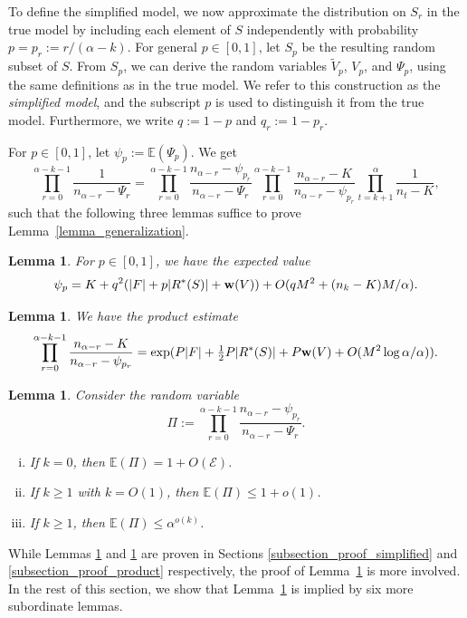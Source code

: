 \documentclass{article}
\theoremstyle{plain}
\theoremstyle{remark}
\theoremstyle{plain}
\newtheorem{lemma}[theorem]{Lemma}
\numberwithin{equation}{section}
\renewcommand{\b}{{\bf{w}}}
\begin{document}
	
	To define the simplified model, we now approximate the distribution on $S_r$ in the true model by including each element of $S$ independently with probability $p=p_r:=r/(\alpha-k)$. For general $p\in[0,1]$, let $S_p$ be the resulting random subset of $S$. From $S_p$, we can derive the random variables $\widetilde{V}_p$, $V_p$, and $\Psi_p$, using the same definitions as in the true model. We refer to this construction as the \emph{simplified model}, and the subscript $p$ is used to distinguish it from the true model. Furthermore, we write $q:=1-p$ and $q_r:=1-p_r$.
	
	For $p\in[0,1]$, let $\psi_p:=\mathbb{E}(\Psi_p)$. We get $$\prod_{r=0}^{\alpha-k-1}\frac1{n_{\alpha-r}-\Psi_r}=\prod_{r=0}^{\alpha-k-1}\frac{n_{\alpha-r}-\psi_{p_r}}{n_{\alpha-r}-\Psi_r}\prod_{r=0}^{\alpha-k-1}\frac{n_{\alpha-r}-K}{n_{\alpha-r}-\psi_{p_r}}\prod_{t=k+1}^{\alpha}\frac1{n_t-K},$$ such that the following three lemmas suffice to prove Lemma~\ref{lemma_generalization}.
	
	\begin{lemma}\label{lemma_expectation}
		For $p\in[0,1]$, we have the expected value $$\psi_p=K+q^2(|F|+p|R^*(S)|+\b(V))+O(qM^2+(n_k-K)M/\alpha).$$
	\end{lemma}
	
	\begin{lemma}\label{lemma_product}
		We have the product estimate $$\prod_{r=0}^{\alpha-k-1}\frac{n_{\alpha-r}-K}{n_{\alpha-r}-\psi_{p_r}}=\exp(P|F|+\tfrac12P|R^*(S)|+P\b(V)+O(M^2\log\alpha/\alpha)).$$
	\end{lemma}
	
	\begin{lemma}\label{lemma_concentration}
		Consider the random variable $$\Pi:=\prod_{r=0}^{\alpha-k-1}\frac{n_{\alpha-r}-\psi_{p_r}}{n_{\alpha-r}-\Psi_r}.$$
		\begin{enumerate}[(i)]
			\item\label{lemma_concentration_zero} If $k=0$, then $\mathbb{E}(\Pi)=1+O(\mathscr{E})$.
			\item\label{lemma_concentration_small} If $k\geq1$ with $k=O(1)$, then $\mathbb{E}(\Pi)\leq1+o(1)$.
			\item\label{lemma_concentration_large} If $k\geq1$, then $\mathbb{E}(\Pi)\leq\alpha^{o(k)}$.
		\end{enumerate}
	\end{lemma}
	
	While Lemmas \ref{lemma_expectation} and \ref{lemma_product} are proven in Sections \ref{subsection_proof_simplified} and \ref{subsection_proof_product} respectively, the proof of Lemma~\ref{lemma_concentration} is more involved. In the rest of this section, we show that Lemma~\ref{lemma_concentration} is implied by six more subordinate lemmas.
	
\end{document}
